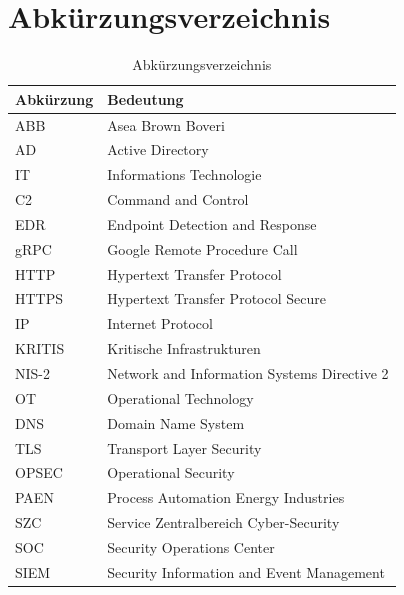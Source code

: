 \documentclass{article}
\begin{document}
\section*{Abkürzungsverzeichnis}
\begin{table}[H]
    \centering
    \begin{tabularx}{\textwidth}{@{} l X @{}}
\toprule
\textbf{Abkürzung} & \textbf{Bedeutung} \\
\midrule
ABB  & Asea Brown Boveri \\
AD   & Active Directory \\
IT   & Informations Technologie \\
C2   & Command and Control \\
EDR  & Endpoint Detection and Response \\
gRPC & Google Remote Procedure Call \\
HTTP & Hypertext Transfer Protocol \\
HTTPS & Hypertext Transfer Protocol Secure \\
IP   & Internet Protocol \\
KRITIS & Kritische Infrastrukturen \\
NIS-2 & Network and Information Systems Directive 2 \\
OT   & Operational Technology \\
DNS  & Domain Name System \\
TLS  & Transport Layer Security \\
OPSEC & Operational Security \\
PAEN & Process Automation Energy Industries \\
SZC  & Service Zentralbereich Cyber-Security \\
SOC  & Security Operations Center \\
SIEM & Security Information and Event Management \\
\bottomrule
\end{tabularx}
    \caption{Abkürzungsverzeichnis}
    \label{tab:Abkürzungsverzeichnis}
\end{table}
\newpage
\end{document}
